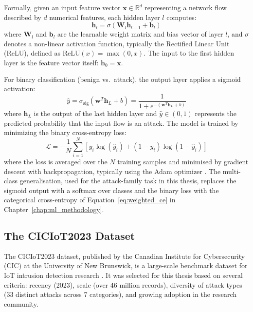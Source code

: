 \par Formally, given an input feature vector $\mathbf{x} \in \mathbb{R}^d$ representing a network flow described by $d$ numerical features, each hidden layer $l$ computes:
\begin{equation}
    \mathbf{h}_l = \sigma(\mathbf{W}_l \mathbf{h}_{l-1} + \mathbf{b}_l)
    \label{eq:mlp_hidden}
\end{equation}
where $\mathbf{W}_l$ and $\mathbf{b}_l$ are the learnable weight matrix and bias vector of layer $l$, and $\sigma$ denotes a non-linear activation function, typically the Rectified Linear Unit (ReLU), defined as $\text{ReLU}(x) = \max(0, x)$. The input to the first hidden layer is the feature vector itself: $\mathbf{h}_0 = \mathbf{x}$.

\par For binary classification (benign vs.\ attack), the output layer applies a sigmoid activation:
\begin{equation}
    \hat{y} = \sigma_{\text{sig}}(\mathbf{w}^T \mathbf{h}_L + b) = \frac{1}{1 + e^{-(\mathbf{w}^T \mathbf{h}_L + b)}}
    \label{eq:mlp_output}
\end{equation}
where $\mathbf{h}_L$ is the output of the last hidden layer and $\hat{y} \in (0, 1)$ represents the predicted probability that the input flow is an attack. The model is trained by minimizing the binary cross-entropy loss:
\begin{equation}
    \mathcal{L} = -\frac{1}{N} \sum_{i=1}^{N} \left[ y_i \log(\hat{y}_i) + (1 - y_i) \log(1 - \hat{y}_i) \right]
    \label{eq:bce_loss}
\end{equation}
where the loss is averaged over the $N$ training samples and minimised by gradient descent with backpropagation, typically using the Adam optimizer \cite{Kingma2015}. The multi-class generalisation, used for the attack-family task in this thesis, replaces the sigmoid output with a softmax over classes and the binary loss with the categorical cross-entropy of Equation~\eqref{eq:weighted_ce} in Chapter~\ref{chap:ml_methodology}.

\subsection{The CICIoT2023 Dataset}
\label{sec:ciciot2023}

\par The CICIoT2023 dataset, published by the Canadian Institute for Cybersecurity (CIC) at the University of New Brunswick, is a large-scale benchmark dataset for IoT intrusion detection research \cite{CICIoT2023}. It was selected for this thesis based on several criteria: recency (2023), scale (over 46 million records), diversity of attack types (33 distinct attacks across 7 categories), and growing adoption in the research community.


